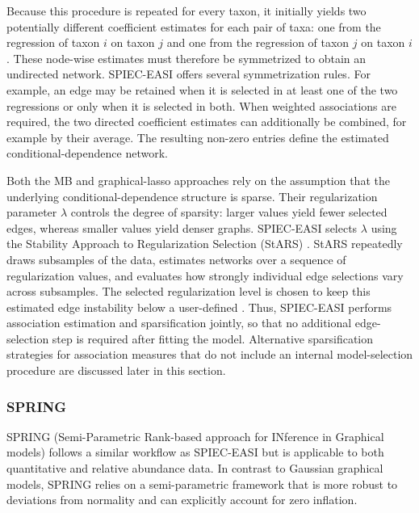 Because this procedure is repeated for every taxon, it initially yields two potentially different coefficient estimates for each pair of taxa: one from the regression of taxon $i$ on taxon $j$ and one from the regression of taxon $j$ on taxon $i$. These node-wise estimates must therefore be symmetrized to obtain an undirected network. SPIEC-EASI offers several symmetrization rules. For example, an edge may be retained when it is selected in at least one of the two regressions or only when it is selected in both. When weighted associations are required, the two directed coefficient estimates can additionally be combined, for example by their average. The resulting non-zero entries define the estimated conditional-dependence network.

Both the MB and graphical-lasso approaches rely on the assumption that the underlying conditional-dependence structure is sparse. Their regularization parameter $\lambda$ controls the degree of sparsity: larger values yield fewer selected edges, whereas smaller values yield denser graphs. SPIEC-EASI selects $\lambda$ using the Stability Approach to Regularization Selection (StARS) \citep{liu2010stability}. StARS repeatedly draws subsamples of the data, estimates networks over a sequence of regularization values, and evaluates how strongly individual edge selections vary across subsamples. The selected regularization level is chosen to keep this estimated edge instability below a user-defined . Thus, SPIEC-EASI performs association estimation and sparsification jointly, so that no additional edge-selection step is required after fitting the model. Alternative sparsification strategies for association measures that do not include an internal model-selection procedure are discussed later in this section.

\subsubsection{SPRING}
\label{sec:5net:net_constr:spring}

SPRING (Semi-Parametric Rank-based approach for INference in Graphical models) \citep{yoon2019microbial} follows a similar workflow as SPIEC-EASI but is applicable to both quantitative and relative abundance data. In contrast to Gaussian graphical models, SPRING relies on a semi-parametric framework that is more robust to deviations from normality and can explicitly account for zero inflation.

